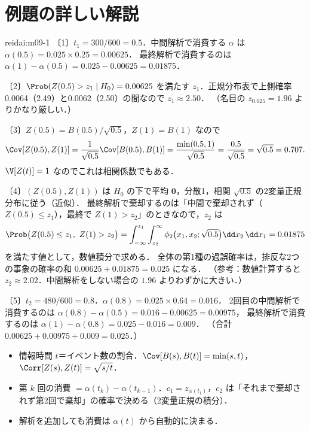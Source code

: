 \section{例題の詳しい解説}\label{sec:m09-kaisetsu}
\begin{kaitou}{reidai:m09-1}
〔1〕$t_1=300/600=0.5$．中間解析で消費する $\alpha$ は $\alpha(0.5)=0.025\times0.25=0.00625$．
最終解析で消費するのは $\alpha(1)-\alpha(0.5)=0.025-0.00625=0.01875$．

〔2〕$\Prob(Z(0.5)>z_1\mid H_0)=0.00625$ を満たす $z_1$．正規分布表で上側確率0.0064（2.49）と0.0062（2.50）の間なので $z_1\approx2.50$．
（名目の $z_{0.025}=1.96$ よりかなり厳しい．）

〔3〕$Z(0.5)=B(0.5)/\sqrt{0.5}$，$Z(1)=B(1)$ なので
\[
\Cov[Z(0.5),Z(1)]=\frac{1}{\sqrt{0.5}}\Cov[B(0.5),B(1)]=\frac{\min(0.5,1)}{\sqrt{0.5}}=\frac{0.5}{\sqrt{0.5}}=\sqrt{0.5}=0.707 .
\]
$\V[Z(t)]=1$ なのでこれは相関係数でもある．

〔4〕$(Z(0.5),Z(1))$ は $H_0$ の下で平均 $\bm0$，分散1，相関 $\sqrt{0.5}$ の2変量正規分布に従う（近似）．
最終解析で棄却するのは「中間で棄却されず（$Z(0.5)\le z_1$），最終で $Z(1)>z_2$」のときなので，$z_2$ は
\[
\Prob\bigl(Z(0.5)\le z_1,\ Z(1)>z_2\bigr)=\int_{-\infty}^{z_1}\int_{z_2}^{\infty}\phi_2\bigl(x_1,x_2;\sqrt{0.5}\bigr)\dd x_2\,\dd x_1=0.01875
\]
を満たす値として，数値積分で求める．
全体の第1種の過誤確率は，排反な2つの事象の確率の和 $0.00625+0.01875=0.025$ になる．
（参考：数値計算すると $z_2\approx2.02$．中間解析をしない場合の $1.96$ よりわずかに大きい．）

〔5〕$t_2=480/600=0.8$．$\alpha(0.8)=0.025\times0.64=0.016$．
2回目の中間解析で消費するのは $\alpha(0.8)-\alpha(0.5)=0.016-0.00625=0.00975$，
最終解析で消費するのは $\alpha(1)-\alpha(0.8)=0.025-0.016=0.009$．
（合計 $0.00625+0.00975+0.009=0.025$．）
\end{kaitou}

\begin{summarybox}
\begin{itemize}
\item 情報時間 $t$＝イベント数の割合．$\Cov[B(s),B(t)]=\min(s,t)$，$\Corr[Z(s),Z(t)]=\sqrt{s/t}$．
\item 第 $k$ 回の消費 $=\alpha(t_k)-\alpha(t_{k-1})$．$c_1=z_{\alpha(t_1)}$，$c_2$ は「それまで棄却されず第2回で棄却」の確率で決める（2変量正規の積分）．
\item 解析を追加しても消費は $\alpha(t)$ から自動的に決まる．
\end{itemize}
\end{summarybox}

